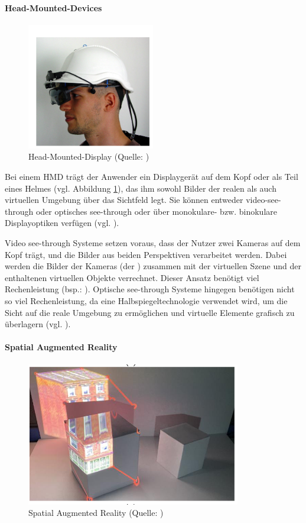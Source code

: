 \paragraph{Head-Mounted-Devices}

\begin{figure}[ht]
\centering
\includegraphics[width=0.5\linewidth]{content/pictures/hmd-ar.PNG}
\caption{Head-Mounted-Display (Quelle: \citealp[S. 4]{reitmayr_location_2003})}
\label{fig:hmd-ar}
\end{figure}

Bei einem \ac{HMD} trägt der Anwender ein Displaygerät auf dem Kopf oder als Teil eines Helmes (vgl. Abbildung \ref{fig:hmd-ar}), das ihm sowohl Bilder der realen als auch virtuellen Umgebung über das Sichtfeld legt. Sie können entweder video-see-through oder optisches see-through oder über monokulare- bzw. binokulare Displayoptiken verfügen (vgl. \citealp[S. 346]{carmigniani_augmented_2011}).

Video see-through Systeme setzen voraus, dass der Nutzer zwei Kameras auf dem Kopf trägt, und die Bilder aus beiden Perspektiven verarbeitet werden. Dabei werden die Bilder der Kameras (der ) zusammen mit der virtuellen Szene und der enthaltenen virtuellen Objekte verrechnet. Dieser Ansatz benötigt viel Rechenleistung (bsp.: \cite{noauthor_vive_nodate}). Optische see-through Systeme hingegen benötigen nicht so viel Rechenleistung, da eine Halbspiegeltechnologie verwendet wird, um die Sicht auf die reale Umgebung zu ermöglichen und virtuelle Elemente grafisch zu überlagern (vgl. \citealp[S. 346f]{carmigniani_augmented_2011}).

\paragraph{Spatial Augmented Reality}
\begin{figure}[ht]
\centering
\includegraphics[width=0.5\linewidth]{content/pictures/spatial-ar.PNG}
\caption{Spatial Augmented Reality (Quelle: \citealp[S. 7]{jin_bim-based_2020})}
\label{fig:spatial-ar}
\end{figure}

